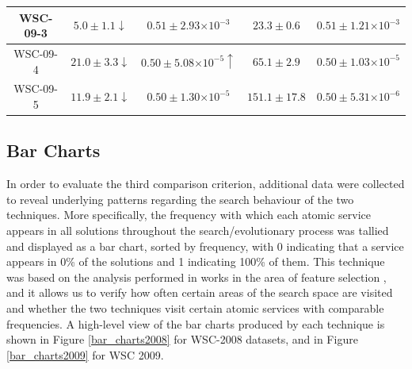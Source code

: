 \documentclass{llncs}
\providecommand{\e}[1]{\ensuremath{\times 10^{#1}}}
\begin{document}
\begin{table}[h]
\begin{tabular}{|c|c|c|c|c|}
WSC-09-3                       & $5.0 \pm 1.1 \downarrow$ & $0.51 \pm 2.93\e{-3}$          & $23.3 \pm 0.6$            & $0.51 \pm 1.21\e{-3}$          \\ \hline
WSC-09-4                       & $21.0\pm 3.3 \downarrow$ & $0.50 \pm 5.08\e{-5} \uparrow$ & $65.1 \pm 2.9$            & $0.50 \pm 1.03\e{-5}$          \\ \hline
WSC-09-5                       & $11.9\pm 2.1 \downarrow$ & $0.50 \pm 1.30\e{-5}$          & $151.1\pm 17.8$           & $0.50 \pm 5.31\e{-6}$          \\ \hline
\end{tabular}
\end{table}

\subsection{Bar Charts}

In order to evaluate the third comparison criterion, additional data were collected to reveal underlying patterns regarding the search behaviour of the two techniques. More specifically, the frequency with which each atomic service appears in all solutions throughout the search/evolutionary process was tallied and displayed as a bar chart, sorted by frequency, with 0 indicating that a service appears in 0\% of the solutions and 1 indicating 100\% of them. This technique was based on the analysis performed in works in the area of feature selection \cite{NguyenEvoStar2015,filterWrapperCEC2015}, and it allows us to verify how often certain areas of the search space are visited and whether the two techniques visit certain atomic services with comparable frequencies. A high-level view of the bar charts produced by each technique is shown in Figure \ref{bar_charts2008} for WSC-2008 datasets, and in Figure \ref{bar_charts2009} for WSC 2009.
\end{document}
